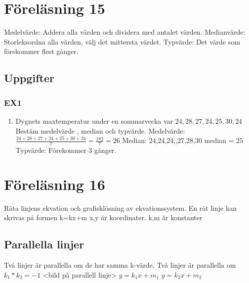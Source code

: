 \documentclass[a4paper,10pt]{article}
\newcommand*\circled[1]{\tikz[baseline=(char.base)]{
              \node[shape=circle,draw,inner sep=2pt] (char) {#1};}}
\begin{document}
\begin{flushleft}
\section{Föreläsning 15}
  Medelvärde: Addera alla värden och dividera med antalet värden.\newline
  Medianvärde: Storleksordna alla värden, välj det mittersta värdet.\newline
  Typvärde: Det värde som förekommer flest gånger.\newline
  \subsection{Uppgifter}
    \subsubsection{EX1}
    \begin{enumerate}
      \item Dygnets maxtemperatur under en sommarvecka var $24,28,27,24,25,30,24$\newline
      Bestäm medelvärde , median och typvärde.\newline
      Medelvärde: $ \frac{24+28+27+24+25+30+24}{7} = \frac{182}{7} = 26 $\newline
      Median:  24,24,24,\circled{25},27,28,30  median = $25$\newline
      Typvärde: Förekommer 3 gånger.\newline
    \end{enumerate}
    
\section{Föreläsning 16}
Räta linjens ekvation och grafisklösning av ekvationssystem. \newline\newline 
En rät linje kan skrivas på formen k=kx+m\newline
x,y är koordinater. k,m är konstanter


\subsection{Parallella linjer}
Två linjer är parallella om de har samma k-värde.\newline
Två linjer är parallella om $k_1 * k_2 = -1$ \newline
<bild på parallell linje>\newline
$y = k_1 x + m_1$ \newline
$y = k_2 x + m_2$ \newline


\end{flushleft}
\end{document}
